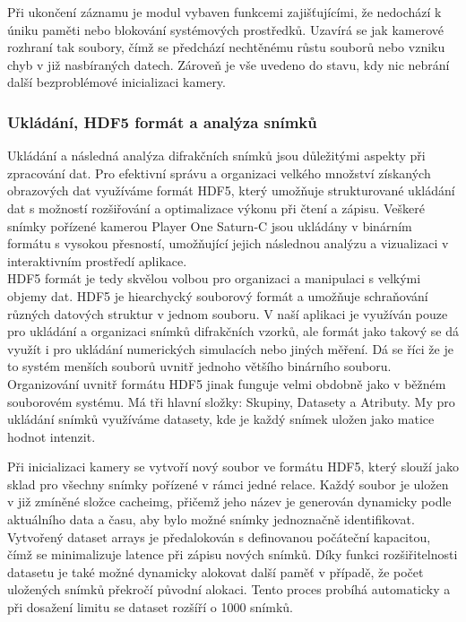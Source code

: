 \documentclass[a4paper,11pt]{article}
\begin{document}
Při ukončení záznamu je modul vybaven funkcemi zajišťujícími, že nedochází k úniku paměti nebo blokování systémových prostředků. Uzavírá se jak kamerové rozhraní tak soubory, čímž se předchází nechtěnému růstu souborů nebo vzniku chyb v již nasbíraných datech. Zároveň je vše uvedeno do stavu, kdy nic nebrání další bezproblémové inicializaci kamery.


\subsubsection{Ukládání, HDF5 formát a analýza snímků}
Ukládání a následná analýza difrakčních snímků jsou důležitými aspekty při zpracování dat. Pro efektivní správu a organizaci velkého množství získaných obrazových dat využíváme formát HDF5, který umožňuje strukturované ukládání dat s možností rozšiřování a optimalizace výkonu při čtení a zápisu. Veškeré snímky pořízené kamerou Player One Saturn-C jsou ukládány v binárním formátu s vysokou přesností, umožňující jejich následnou analýzu a vizualizaci v interaktivním prostředí aplikace.\\

HDF5 formát je tedy skvělou volbou pro organizaci a manipulaci s velkými objemy dat. HDF5 je hiearchycký souborový formát a umožňuje schraňování různých datových struktur v jednom souboru. V naší aplikaci je využíván pouze pro ukládání a organizaci snímků difrakčních vzorků, ale formát jako takový se dá využít i pro ukládání numerických simulacích nebo jiných měření. Dá se říci že je to systém menších souborů uvnitř jednoho většího binárního souboru. Organizování uvnitř formátu HDF5 jinak funguje velmi obdobně jako v běžném souborovém systému. Má tři hlavní složky: Skupiny, Datasety a Atributy. My pro ukládání snímků využíváme datasety, kde je každý snímek uložen jako matice hodnot intenzit.

Při inicializaci kamery se vytvoří nový soubor ve formátu HDF5, který slouží jako sklad pro všechny snímky pořízené v rámci jedné relace. Každý soubor je uložen v již zmíněné složce cacheimg, přičemž jeho název je generován dynamicky podle aktuálního data a času, aby bylo možné snímky jednoznačně identifikovat. Vytvořený dataset arrays je předalokován s definovanou počáteční kapacitou, čímž se minimalizuje latence při zápisu nových snímků. Díky funkci rozšiřitelnosti datasetu je také možné dynamicky alokovat další paměť v případě, že počet uložených snímků překročí původní alokaci. Tento proces probíhá automaticky a při dosažení limitu se dataset rozšíří o 1000 snímků.\\
\end{document}
